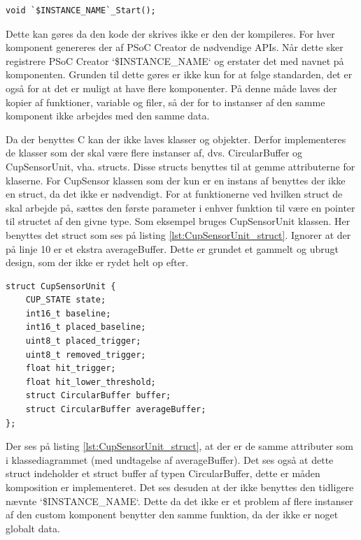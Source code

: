 \documentclass[Softwaredesign/Softwaredesign_main.tex]{subfiles}
\begin{document}
\begin{lstlisting}[caption={Eksempel på hvordan der skrives navnet på blokken som en del af funktionen},style=customc,label={lst:start_naming}]
void `$INSTANCE_NAME`_Start();
\end{lstlisting}

Dette kan gøres da den kode der skrives ikke er den der kompileres. For hver komponent genereres der af PSoC Creator de nødvendige APIs. Når dette sker registrere PSoC Creator `\$INSTANCE\_NAME` og erstater det med navnet på komponenten. 
Grunden til dette gøres er ikke kun for at følge standarden, det er også for at det er muligt at have flere komponenter. På denne måde laves der kopier af funktioner, variable og filer, så der for to instanser af den samme komponent ikke arbejdes med den samme data.


Da der benyttes C kan der ikke laves klasser og objekter. Derfor implementeres de klasser som der skal være flere instanser af, dvs. CircularBuffer og CupSensorUnit, vha. structs. Disse structs benyttes til at gemme attributerne for klaserne. For CupSensor klassen som der kun er en instans af benyttes der ikke en struct, da det ikke er nødvendigt. For at funktionerne ved hvilken struct de skal arbejde på, sættes den første parameter i enhver funktion til være en pointer til structet af den givne type. 
Som eksempel bruges CupSensorUnit klassen. Her benyttes det struct som ses på listing \ref{lst:CupSensorUnit_struct}. Ignorer at der på linje 10 er et ekstra averageBuffer. Dette er grundet et gammelt og ubrugt design, som der ikke er rydet helt op efter. 
\begin{lstlisting}[caption={Eksempel på struct til CupSensorUnit},style=customc,label={lst:CupSensorUnit_struct}]
struct CupSensorUnit {
    CUP_STATE state;
    int16_t baseline; 
    int16_t placed_baseline; 
    uint8_t placed_trigger;
    uint8_t removed_trigger;
    float hit_trigger; 
    float hit_lower_threshold;
    struct CircularBuffer buffer;
    struct CircularBuffer averageBuffer;
};
\end{lstlisting}

Der ses på listing \ref{lst:CupSensorUnit_struct}, at der er de samme attributer som i klassediagrammet (med undtagelse af averageBuffer). Det ses også at dette struct indeholder et struct buffer af typen CircularBuffer, dette er måden komposition er implementeret. Det ses desuden at der ikke benyttes den tidligere nævnte `\$INSTANCE\_NAME`. Dette da det ikke er et problem af flere instanser af den custom komponent benytter den samme funktion, da der ikke er noget globalt data. 
\end{document}
